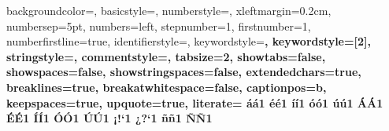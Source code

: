 


 {%
  backgroundcolor=\color{codeBakground},
  basicstyle=\small,
  numberstyle=\tiny\color{codeNumbers},
  xleftmargin={0.2cm},
  numbersep=5pt,
  numbers=left,
  stepnumber=1,
  firstnumber=1,
  numberfirstline=true,
  identifierstyle=\color{black},
  keywordstyle=\color{codeKeyword}\bfseries,
  keywordstyle={[2]\color{codeKeyword}},
  stringstyle=\color{codeString}\ttfamily,
  commentstyle=\color{codeComment}\ttfamily,
  tabsize=2,
  showtabs=false,
  showspaces=false,
  showstringspaces=false,
  extendedchars=true,
  breaklines=true,
  breakatwhitespace=false,
  captionpos=b,
  keepspaces=true,
  upquote=true,                      %
  literate=%
  {á}{{\'a}}1 {é}{{\'e}}1 {í}{{\'i}}1 {ó}{{\'o}}1 {ú}{{\'u}}1
  {Á}{{\'A}}1 {É}{{\'E}}1 {Í}{{\'I}}1 {Ó}{{\'O}}1 {Ú}{{\'U}}1
  {¡}{{!`}}1  {¿}{{?`}}1
  {ñ}{{\~n}}1 {Ñ}{{\~N}}1
}

\lstset{style=mystyle}

